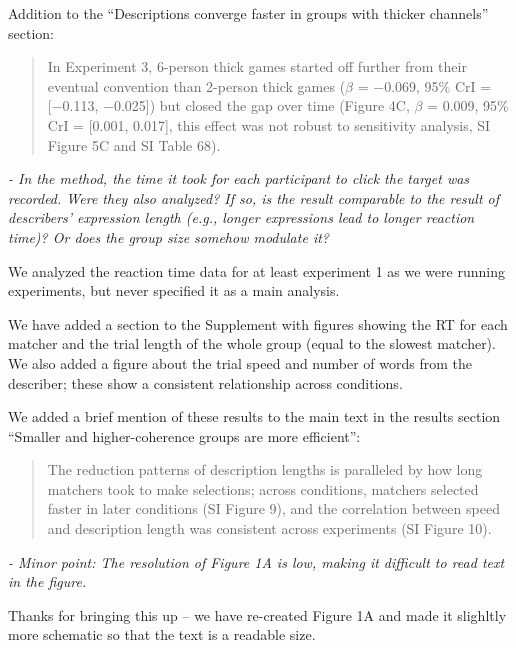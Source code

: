 \documentclass{stanfordletter}
\newcommand{\theysaid}[1]{\begin{leftbar} \noindent 
		\textsl{ #1}\end{leftbar}}
\newcommand{\revised}[1]{\begin{quote}	#1 \end{quote}}
\begin{document}
\begin{letter}{}
          	Addition to the ``Descriptions converge faster in groups with thicker channels'' section: 
          	\revised{In Experiment 3, 6-person thick games started off further
          		from their eventual convention than 2-person thick games ($\beta$ = −0.069, 95\% CrI = [−0.113, −0.025])
          		but closed the gap over time (Figure 4C, $\beta$ = 0.009, 95\% CrI = [0.001, 0.017], this effect was not robust to sensitivity analysis,
          		SI Figure 5C and SI Table 68).}
          	
          \theysaid{- In the method, the time it took for each participant to click the target was recorded. Were they also analyzed? If so, is the result comparable to the result of describers' expression length (e.g., longer expressions lead to longer reaction time)? Or does the group size somehow modulate it?}
          
          
          We analyzed the reaction time data for at least experiment 1 as we were running experiments, but never specified it as a main analysis. 
          
          We have added a section to the Supplement with figures showing the RT for each matcher and the trial length of the whole group (equal to the slowest matcher). We also added a figure about the trial speed and number of words from the describer; these show a consistent relationship across conditions. 
          
          We added a brief mention of these results to the main text in the results section ``Smaller and higher-coherence groups are more efficient'':
          
          \revised{The reduction patterns of description lengths is paralleled by how long matchers took to make selections; across conditions, matchers selected faster in later conditions (SI Figure 9), and the correlation between speed and description length was consistent across experiments (SI Figure 10).}
          
          \theysaid{- Minor point: The resolution of Figure 1A is low, making it difficult to read text in the figure.}
          
          Thanks for bringing this up -- we have re-created Figure 1A and made it slighltly more schematic so that the text is a readable size. 
          

\end{letter}
\end{document}
